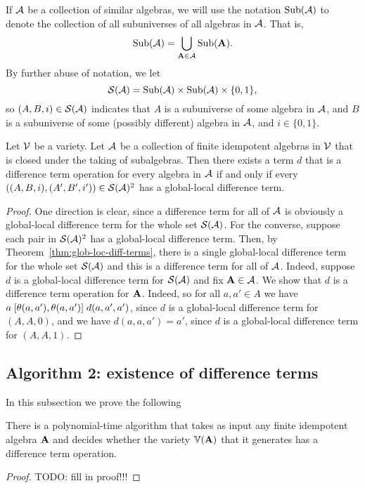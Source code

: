If $\mathcal{A}$ be a collection of similar algebras, we will use the notation
$\operatorname{Sub}(\mathcal{A})$ to denote the collection of all subuniverses of all algebras in
$\mathcal{A}$.
That is,
\[
\operatorname{Sub}(\mathcal{A}) = \bigcup_{\mathbf{A} \in \mathcal{A}} \operatorname{Sub}(\mathbf{A}).
\]
By further abuse of notation, we let
\[
\mathcal{S}(\mathcal{A}) = \operatorname{Sub}(\mathcal{A}) \times \operatorname{Sub}(\mathcal{A}) \times \{0,1\},
\]
so $(A, B, i)\in \mathcal{S}(\mathcal{A})$ indicates that
$A$ is a subuniverse of some algebra in $\mathcal{A}$,
and $B$ is a subuniverse of some (possibly different) algebra in $\mathcal{A}$,
and $i\in \{0,1\}$.
\begin{cor}
  \label{cor:glob-loc-diff-term}
  Let $\mathcal{V}$ be a variety.  Let $\mathcal{A}$ be a collection of finite idempotent
  algebras in $\mathcal{V}$ that is closed under the taking of subalgebras.
  Then there exists a term $d$ that is a difference term operation for every
  algebra in $\mathcal{A}$ if and only if every
  $((A,B,i), (A',B',i')) \in \mathcal{S}(\mathcal{A})^2$ has a global-local
  difference term.
\end{cor}
\begin{proof}
  One direction is clear, since a difference term for all of $\mathcal{A}$ is
  obviously a global-local difference term for the whole set $\mathcal{S}(\mathcal{A})$.
  For the converse, suppose
  each pair in $\mathcal{S}(\mathcal{A})^2$ has a global-local
  difference term. Then, by Theorem~\ref{thm:glob-loc-diff-terms},
  there is a single global-local difference term for the whole set
  $\mathcal{S}(\mathcal{A})$
  and this is a difference term for all of $\mathcal{A}$.  Indeed, suppose $d$ is a
  global-local difference term for $\mathcal{S}(\mathcal{A})$ and fix $\mathbf{A} \in \mathcal{A}$. We show
  that $d$ is a difference term operation for $\mathbf{A}$. Indeed,
  so for all  $a, a' \in A$ we have 
  $a \mathrel{[\theta(a,a'), \theta(a,a')]} d(a,a',a')$,
  since $d$ is a global-local difference term for $(A,A,0)$, and we have
  $d(a,a,a') = a'$, since $d$ is a global-local difference term for
  $(A,A,1)$.
\end{proof}


\subsection{Algorithm 2: existence of difference terms}
In this subsection we prove the following
\begin{cor}
  There is a polynomial-time algorithm that takes as input
  any finite idempotent algebra $\mathbf{A}$ and decides whether
  the variety $\operatorname{\mathbb{V}}(\mathbf{A})$ that it generates
  has a difference term operation.
\end{cor}
\begin{proof}
  TODO: fill in proof!!!
\end{proof}
